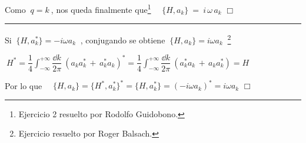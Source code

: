 Como $\ q=k\ $, nos queda finalmente que\footnote{Ejercicio 2 resuelto por Rodolfo Guidobono.} $\quad \{H,a_k\} \ = \ i\, \omega\, a_k$  \hspace{7cm}$\Box$


\vspace{10mm}

\begin{center}\rule{250pt}{0.5pt}\end{center}

\vspace{10mm}



Si $ \ \{ H,a_k^*\} = - i \omega a_k \ $ , conjugando se obtiene $ \ \{H,a_k\}=i\omega a_k \ $ \footnote{Ejercicio resuelto por Roger Balsach.}

\vspace{5mm}$\ \displaystyle H^*=\dfrac 1 4  \int_{-\infty}^{+\infty} \dfrac{\dd k}{2\pi} \ (a_ka_k^*\, + \, a_k^*a_k)^* =\dfrac 1 4  \int_{-\infty}^{+\infty} \dfrac{\dd k}{2\pi} \ (a_k^*a_k\, + \, a_ka_k^*)=H$

Por lo que $\quad \{H,a_k\}=\{H^*,a_k^*\}^*=\{H,a^*_k\}=(-i	\omega a_k)^*=i\omega a_k $ \hspace{6.5cm} $\Box$

\color{black} 







